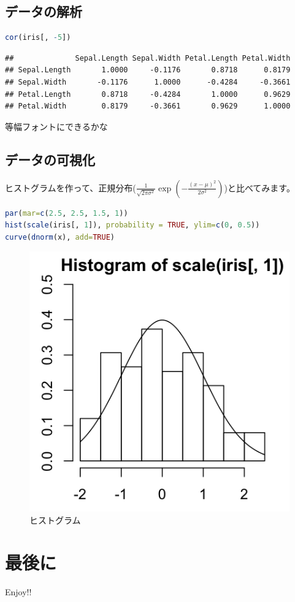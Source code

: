 \documentclass[]{ltjarticle}
\begin{document}
\subsection{データの解析}\label{ux30c7ux30fcux30bfux306eux89e3ux6790}

\begin{lstlisting}[language=R]
cor(iris[, -5])
\end{lstlisting}

\begin{lstlisting}
##              Sepal.Length Sepal.Width Petal.Length Petal.Width
## Sepal.Length       1.0000     -0.1176       0.8718      0.8179
## Sepal.Width       -0.1176      1.0000      -0.4284     -0.3661
## Petal.Length       0.8718     -0.4284       1.0000      0.9629
## Petal.Width        0.8179     -0.3661       0.9629      1.0000
\end{lstlisting}

等幅フォントにできるかな

\subsection{データの可視化}\label{ux30c7ux30fcux30bfux306eux53efux8996ux5316}

ヒストグラムを作って、正規分布($\frac{1}{\sqrt{2\pi\sigma^2}} \exp\left(-\frac{\left(x-\mu\right)^2}{2\sigma^2}\right)$)と比べてみます。

\begin{lstlisting}[language=R]
par(mar=c(2.5, 2.5, 1.5, 1))
hist(scale(iris[, 1]), probability = TRUE, ylim=c(0, 0.5))
curve(dnorm(x), add=TRUE)
\end{lstlisting}

\begin{figure}[htbp]
\centering
\includegraphics{figure/md-docx-fig1.png}
\caption{ヒストグラム}
\end{figure}

\section{最後に}\label{ux6700ux5f8cux306b}

Enjoy!!
\end{document}
